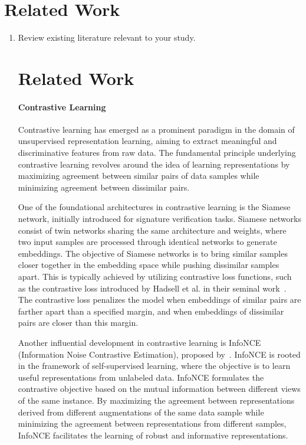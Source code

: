 \section{Related Work}\label{sec:rel_work}

\begin{enumerate}
    \item Review existing literature relevant to your study.
    \section{Related Work}

\paragraph{Contrastive Learning} 
Contrastive learning has emerged as a prominent paradigm in the domain of unsupervised representation learning, aiming to extract meaningful and discriminative features from raw data. The fundamental principle underlying contrastive learning revolves around the idea of learning representations by maximizing agreement between similar pairs of data samples while minimizing agreement between dissimilar pairs.


One of the foundational architectures in contrastive learning is the Siamese network, initially introduced for signature verification tasks. Siamese networks consist of twin networks sharing the same architecture and weights, where two input samples are processed through identical networks to generate embeddings. The objective of Siamese networks is to bring similar samples closer together in the embedding space while pushing dissimilar samples apart. This is typically achieved by utilizing contrastive loss functions, such as the contrastive loss introduced by Hadsell et al. in their seminal work~\cite{bertinetto2016fully}. The contrastive loss penalizes the model when embeddings of similar pairs are farther apart than a specified margin, and when embeddings of dissimilar pairs are closer than this margin.


Another influential development in contrastive learning is InfoNCE (Information Noise Contrastive Estimation), proposed by~\cite{oord2018representation}. InfoNCE is rooted in the framework of self-supervised learning, where the objective is to learn useful representations from unlabeled data. InfoNCE formulates the contrastive objective based on the mutual information between different views of the same instance. By maximizing the agreement between representations derived from different augmentations of the same data sample while minimizing the agreement between representations from different samples, InfoNCE facilitates the learning of robust and informative representations.



\end{enumerate}
